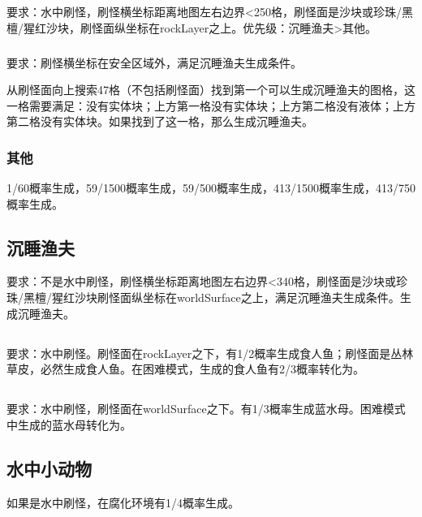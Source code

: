 \subsection{}
要求：水中刷怪，刷怪横坐标距离地图左右边界<250格，刷怪面是沙块或珍珠/黑檀/猩红沙块，刷怪面纵坐标在rockLayer之上。优先级：沉睡渔夫>其他。

\subsubsection{}
要求：刷怪横坐标在安全区域外，满足沉睡渔夫生成条件。

从刷怪面向上搜索47格（不包括刷怪面）找到第一个可以生成沉睡渔夫的图格，这一格需要满足：没有实体块；上方第一格没有实体块；上方第二格没有液体；上方第二格没有实体块。如果找到了这一格，那么生成沉睡渔夫。

\subsubsection{其他}
1/60概率生成，59/1500概率生成，59/500概率生成，413/1500概率生成，413/750概率生成。

\subsection{沉睡渔夫}
要求：不是水中刷怪，刷怪横坐标距离地图左右边界<340格，刷怪面是沙块或珍珠/黑檀/猩红沙块刷怪面纵坐标在worldSurface之上，满足沉睡渔夫生成条件。生成沉睡渔夫。

\subsection{}
要求：水中刷怪。刷怪面在rockLayer之下，有1/2概率生成食人鱼；刷怪面是丛林草皮，必然生成食人鱼。在困难模式，生成的食人鱼有2/3概率转化为。

\subsection{}
要求：水中刷怪，刷怪面在worldSurface之下。有1/3概率生成蓝水母。困难模式中生成的蓝水母转化为。

\subsection{水中小动物}
如果是水中刷怪，在腐化环境有1/4概率生成。

